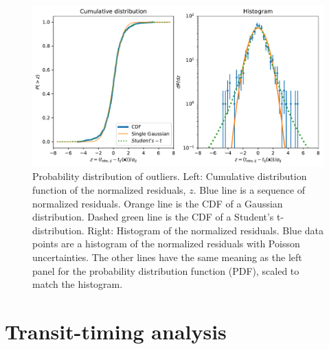 \documentclass[fleqn,usenatbib]{mnras} %
\begin{document}

\begin{figure}
    \centering
    \includegraphics[width=\hsize]{figures/Students_t_optimized.pdf}
    \caption{Probability distribution of outliers.  Left:  Cumulative distribution 
    function of the normalized residuals, $z$.  Blue line is a sequence of normalized residuals. 
    Orange line is the CDF of a Gaussian distribution. %
    Dashed green line is the CDF of a Student's t- 
    distribution.  Right: Histogram of the normalized residuals.  Blue data points 
    are a histogram of the normalized residuals with Poisson uncertainties.  The other lines 
    have the same meaning as the left panel for the probability distribution function 
    (PDF),  scaled to match the histogram.}
    \label{fig:timing_residuals}
\end{figure}


\section{Transit-timing analysis} \label{sec:transit_timing}
\end{document}
